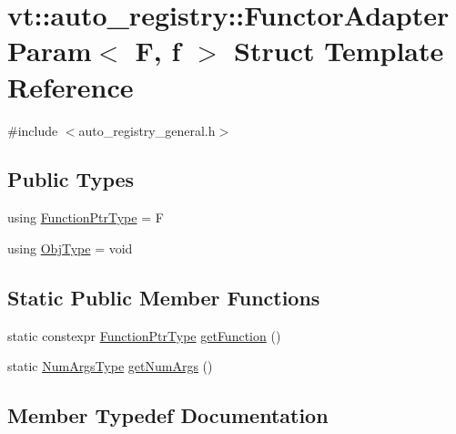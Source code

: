 \hypertarget{structvt_1_1auto__registry_1_1_functor_adapter_param}{}\section{vt\+:\+:auto\+\_\+registry\+:\+:Functor\+Adapter\+Param$<$ F, f $>$ Struct Template Reference}
\label{structvt_1_1auto__registry_1_1_functor_adapter_param}


{\ttfamily \#include $<$auto\+\_\+registry\+\_\+general.\+h$>$}

\subsection*{Public Types}
\begin{DoxyCompactItemize}
\item 
using \hyperlink{structvt_1_1auto__registry_1_1_functor_adapter_param_a67360700f61d3d116cee4619754630be}{Function\+Ptr\+Type} = F
\item 
using \hyperlink{structvt_1_1auto__registry_1_1_functor_adapter_param_ad431c9fd02eed8bb89fed91e86730de7}{Obj\+Type} = void
\end{DoxyCompactItemize}
\subsection*{Static Public Member Functions}
\begin{DoxyCompactItemize}
\item 
static constexpr \hyperlink{structvt_1_1auto__registry_1_1_functor_adapter_param_a67360700f61d3d116cee4619754630be}{Function\+Ptr\+Type} \hyperlink{structvt_1_1auto__registry_1_1_functor_adapter_param_acd2d07590c0dfa22e86e331260160dde}{get\+Function} ()
\item 
static \hyperlink{namespacevt_1_1auto__registry_aebda1d9d765bc9147dc654ad0712c936}{Num\+Args\+Type} \hyperlink{structvt_1_1auto__registry_1_1_functor_adapter_param_a46cb42cdc04f9592813a5bde120157fa}{get\+Num\+Args} ()
\end{DoxyCompactItemize}


\subsection{Member Typedef Documentation}
\mbox{\label{structvt_1_1auto__registry_1_1_functor_adapter_param_a67360700f61d3d116cee4619754630be}} 
